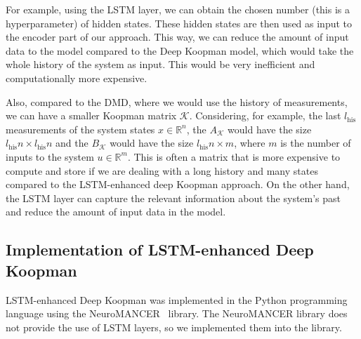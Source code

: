 \documentclass[conference]{IEEEtran}
\newcommand{\ui}[2]{#1_{\text{#2}}}  %
\begin{document}
For example, using the LSTM layer, we can obtain the chosen number (this is a hyperparameter) of hidden states. These hidden states are then used as input to the encoder part of our approach. This way, we can reduce the amount of input data to the model compared to the Deep Koopman model, which would take the whole history of the system as input. This would be very inefficient and computationally more expensive.

Also, compared to the DMD, where we would use the history of measurements, we can have a smaller Koopman matrix \(\mathcal{K}\). Considering, for example, the last \(\ui{l}{his}\) measurements of the system states \(x \in \mathbb{R}^n\), the \(A_\mathcal{K}\) would have the size \(\ui{l}{his}n \times \ui{l}{his}n\) and the \(B_\mathcal{K}\) would have the size \(\ui{l}{his}n \times m\),  where \(m\) is the number of inputs to the system \(u \in \mathbb{R}^m\). This is often a matrix that is more expensive to compute and store if we are dealing with a long history and many states compared to the LSTM-enhanced deep Koopman approach. On the other hand, the LSTM layer can capture the relevant information about the system's past and reduce the amount of input data in the model.

\subsection{Implementation of LSTM-enhanced Deep Koopman}\label{subsec:methodology:lstm_koopman}
LSTM-enhanced Deep Koopman was implemented in the Python programming language using the NeuroMANCER~\cite{Neuromancer2023} library.
The NeuroMANCER library does not provide the use of LSTM layers, so we implemented them into the library.

\end{document}
